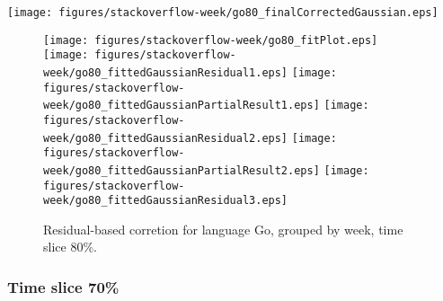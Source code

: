 \begin{center}
{\texttt{[image: figures/stackoverflow-week/go80\_finalCorrectedGaussian.eps]}}
\end{center}

\FloatBarrier

\begin{figure}[t]
\centering
{}
{\texttt{[image: figures/stackoverflow-week/go80\_fitPlot.eps]}}
{\texttt{[image: figures/stackoverflow-week/go80\_fittedGaussianResidual1.eps]}}
{\texttt{[image: figures/stackoverflow-week/go80\_fittedGaussianPartialResult1.eps]}}
{\texttt{[image: figures/stackoverflow-week/go80\_fittedGaussianResidual2.eps]}}
{\texttt{[image: figures/stackoverflow-week/go80\_fittedGaussianPartialResult2.eps]}}
{\texttt{[image: figures/stackoverflow-week/go80\_fittedGaussianResidual3.eps]}}
\caption{Residual-based corretion for language Go, grouped by week, time slice 80\%.}
\end{figure}


\FloatBarrier


\subsubsection{Time slice 70\%}

